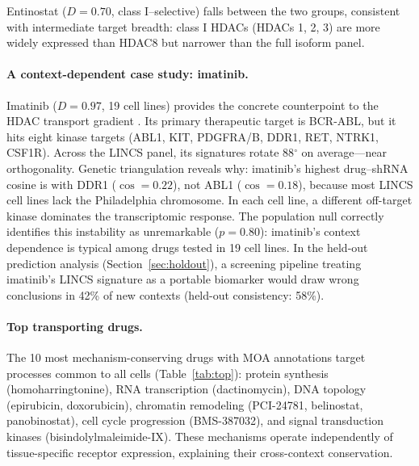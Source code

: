 \documentclass[11pt]{article}
\begin{document}
Entinostat ($D = 0.70$, class I--selective) falls between the two groups,
consistent with intermediate target breadth: class I HDACs (HDACs 1, 2, 3)
are more widely expressed than HDAC8 but narrower than the full isoform
panel.

\paragraph{A context-dependent case study: imatinib.}

Imatinib ($D = 0.97$, 19 cell lines) provides the concrete counterpoint
to the HDAC transport gradient \citep{deininger2005imatinib}. Its primary
therapeutic target is BCR-ABL, but it hits eight kinase targets (ABL1,
KIT, PDGFRA/B, DDR1, RET, NTRK1, CSF1R). Across the LINCS panel, its
signatures rotate 88$^\circ$ on average---near orthogonality. Genetic
triangulation reveals why: imatinib's highest drug--shRNA cosine is with
DDR1 ($\cos = 0.22$), not ABL1 ($\cos = 0.18$), because most LINCS cell
lines lack the Philadelphia chromosome. In each cell line, a different
off-target kinase dominates the transcriptomic response. The population
null correctly identifies this instability as unremarkable ($p = 0.80$):
imatinib's context dependence is typical among drugs tested in 19 cell
lines. In the held-out prediction analysis (Section~\ref{sec:holdout}),
a screening pipeline treating imatinib's LINCS signature as a portable
biomarker would draw wrong conclusions in 42\% of new contexts
(held-out consistency: 58\%).

\paragraph{Top transporting drugs.}

The 10 most mechanism-conserving drugs with MOA annotations target processes
common to all cells (Table~\ref{tab:top}): protein synthesis
(homoharringtonine), RNA transcription (dactinomycin), DNA topology
(epirubicin, doxorubicin), chromatin remodeling (PCI-24781, belinostat,
panobinostat), cell cycle progression (BMS-387032), and signal transduction
kinases (bisindolylmaleimide-IX). These mechanisms operate independently
of tissue-specific receptor expression, explaining their cross-context
conservation.
\end{document}
